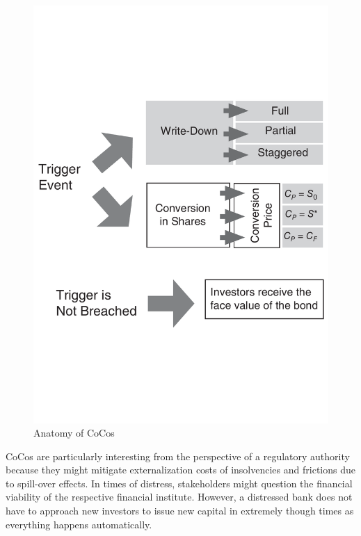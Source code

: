 \begin{figure}[ht]
	\centering
	\includegraphics[trim=0.6cm 7.05cm 0.9cm 7cm, scale = 0.4]{media/anatomy} \par
	\caption[Anatomy of CoCos]{Anatomy of CoCos \citep{de2014handbook}}
	\label{figure:anatomy}
\end{figure}

CoCos are particularly interesting from the perspective of a regulatory authority because they might mitigate externalization costs of insolvencies and frictions due to spill-over effects. In times of distress, stakeholders might question the financial viability of the respective financial institute. However, a distressed bank does not have to approach new investors to issue new capital in extremely though times as everything happens automatically.\citep{de2011pricing}\\ 

